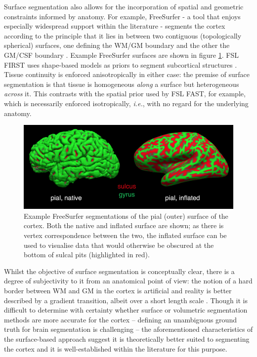 \documentclass[12pt]{report}
\begin{document}
Surface segmentation also allows for the incorporation of spatial and geometric constraints informed by anatomy. For example, FreeSurfer - a tool that enjoys especially widespread support within the literature - segments the cortex according to the principle that it lies in between two contiguous (topologically spherical) surfaces, one defining the WM/GM boundary and the other the GM/CSF boundary \cite{Fischl2012}. Example FreeSurfer surfaces are shown in figure \ref{fs_demo}. FSL FIRST uses shape-based models as priors to segment subcortical structures \cite{Patenaude2011}. Tissue continuity is enforced anisotropically in either case: the premise of surface segmentation is that tissue is homogeneous \textit{along} a surface but heterogeneous \textit{across} it. This contrasts with the spatial prior used by FSL FAST, for example, which is necessarily enforced isotropically, \textit{i.e.}, with no regard for the underlying anatomy. 

\begin{figure}
\centering
\includegraphics[width=\textwidth]{fs_demo.png}
\caption{Example FreeSurfer segmentations of the pial (outer) surface of the cortex. Both the native and inflated surface are shown; as there is vertex correspondence between the two, the inflated surface can be used to visualise data that would otherwise be obscured at the bottom of sulcal pits (highlighted in red).}
\label{fs_demo}
\end{figure}

Whilst the objective of surface segmentation is conceptually clear, there is a degree of subjectivity to it from an anatomical point of view: the notion of a hard border between WM and GM in the cortex is artificial and reality is better described by a gradient transition, albeit over a short length scale \cite{Dale1999}. Though it is difficult to determine with certainty whether surface or volumetric segmentation methods are more accurate for the cortex – defining an unambiguous ground truth for brain segmentation is challenging \cite{Shattuck2009} – the aforementioned characteristics of the surface-based approach suggest it is theoretically better suited to segmenting the cortex and it is well-established within the literature for this purpose. 
\end{document}
